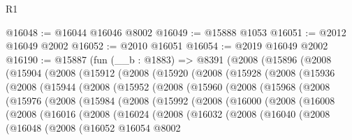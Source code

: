 \begin{lexlean}{R1}
\begin{coremodule}
@16048 := @16044 @16046 @8002
@16049 := @15888 @1053
@16051 := @2012 @16049 @2002
@16052 := @2010 @16051
@16054 := @2019 @16049 @2002
@16190 := @15887
    (fun (__b : @1883) =>
    @8391
      (@2008
        (@15896
          (@2008
            (@15904
              (@2008
                (@15912
                  (@2008
                    (@15920
                      (@2008
                        (@15928
                          (@2008
                            (@15936
                              (@2008
                                (@15944
                                  (@2008
                                    (@15952
                                      (@2008
                                        (@15960
                                          (@2008
                                            (@15968
                                              (@2008
                                                (@15976
                                                  (@2008
                                                    (@15984
                                                      (@2008
                                                        (@15992
                                                          (@2008
                                                            (@16000
                                                              (@2008
                                                                (@16008
                                                                  (@2008
                                                                    (@16016
                                                                      (@2008
                                                                        (@16024
                                                                          (@2008
                                                                            (@16032
                                                                              (@2008
                                                                                (@16040
                                                                                  (@2008
                                                                                    (@16048
                                                                                      (@2008
                                                                                        (@16052
                                                                                          @16054
                                                                                          @8002

\end{coremodule}
\end{lexlean}
